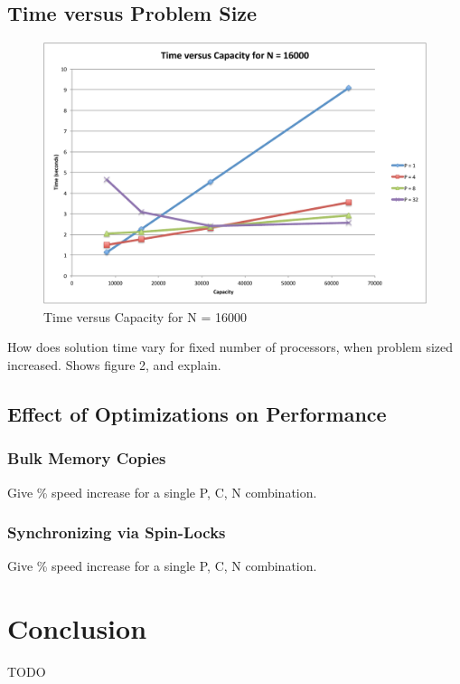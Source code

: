 \documentclass[11pt]{article} %
\begin{document}
\subsection{Time versus Problem Size}

\begin{figure}
\begin{centering}
\includegraphics[width=0.5\paperwidth]{figures/TvsC.pdf}
\caption{Time versus Capacity for N = 16000}
\label{TvsC}
\end{centering}
\end{figure}

How does solution time vary for fixed number of processors, when problem sized increased. Shows figure 2, and explain.

\subsection{Effect of Optimizations on Performance}

\subsubsection{Bulk Memory Copies}

Give \% speed increase for a single P, C, N combination.

\subsubsection{Synchronizing via Spin-Locks}

Give \% speed increase for a single P, C, N combination.

\section{Conclusion}

TODO
\end{document}
